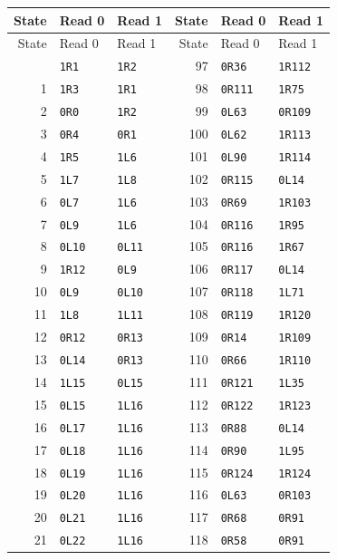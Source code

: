 \begingroup\small
\begin{longtable}{@{}rll@{\qquad}rll@{}}
\toprule State & Read 0 & Read 1 & State & Read 0 & Read 1\\\midrule\endfirsthead
\toprule State & Read 0 & Read 1 & State & Read 0 & Read 1\\\midrule\endhead
\bottomrule\endfoot
0&\texttt{1R1}&\texttt{1R2}&97&\texttt{0R36}&\texttt{1R112}\\
1&\texttt{1R3}&\texttt{1R1}&98&\texttt{0R111}&\texttt{1R75}\\
2&\texttt{0R0}&\texttt{1R2}&99&\texttt{0L63}&\texttt{0R109}\\
3&\texttt{0R4}&\texttt{0R1}&100&\texttt{0L62}&\texttt{1R113}\\
4&\texttt{1R5}&\texttt{1L6}&101&\texttt{0L90}&\texttt{1R114}\\
5&\texttt{1L7}&\texttt{1L8}&102&\texttt{0R115}&\texttt{0L14}\\
6&\texttt{0L7}&\texttt{1L6}&103&\texttt{0R69}&\texttt{1R103}\\
7&\texttt{0L9}&\texttt{1L6}&104&\texttt{0R116}&\texttt{1R95}\\
8&\texttt{0L10}&\texttt{0L11}&105&\texttt{0R116}&\texttt{1R67}\\
9&\texttt{1R12}&\texttt{0L9}&106&\texttt{0R117}&\texttt{0L14}\\
10&\texttt{0L9}&\texttt{0L10}&107&\texttt{0R118}&\texttt{1L71}\\
11&\texttt{1L8}&\texttt{1L11}&108&\texttt{0R119}&\texttt{1R120}\\
12&\texttt{0R12}&\texttt{0R13}&109&\texttt{0R14}&\texttt{1R109}\\
13&\texttt{0L14}&\texttt{0R13}&110&\texttt{0R66}&\texttt{1R110}\\
14&\texttt{1L15}&\texttt{0L15}&111&\texttt{0R121}&\texttt{1L35}\\
15&\texttt{0L15}&\texttt{1L16}&112&\texttt{0R122}&\texttt{1R123}\\
16&\texttt{0L17}&\texttt{1L16}&113&\texttt{0R88}&\texttt{0L14}\\
17&\texttt{0L18}&\texttt{1L16}&114&\texttt{0R90}&\texttt{1L95}\\
18&\texttt{0L19}&\texttt{1L16}&115&\texttt{0R124}&\texttt{1R124}\\
19&\texttt{0L20}&\texttt{1L16}&116&\texttt{0L63}&\texttt{0R103}\\
20&\texttt{0L21}&\texttt{1L16}&117&\texttt{0R68}&\texttt{0R91}\\
21&\texttt{0L22}&\texttt{1L16}&118&\texttt{0R58}&\texttt{0R91}\\

\end{longtable}
